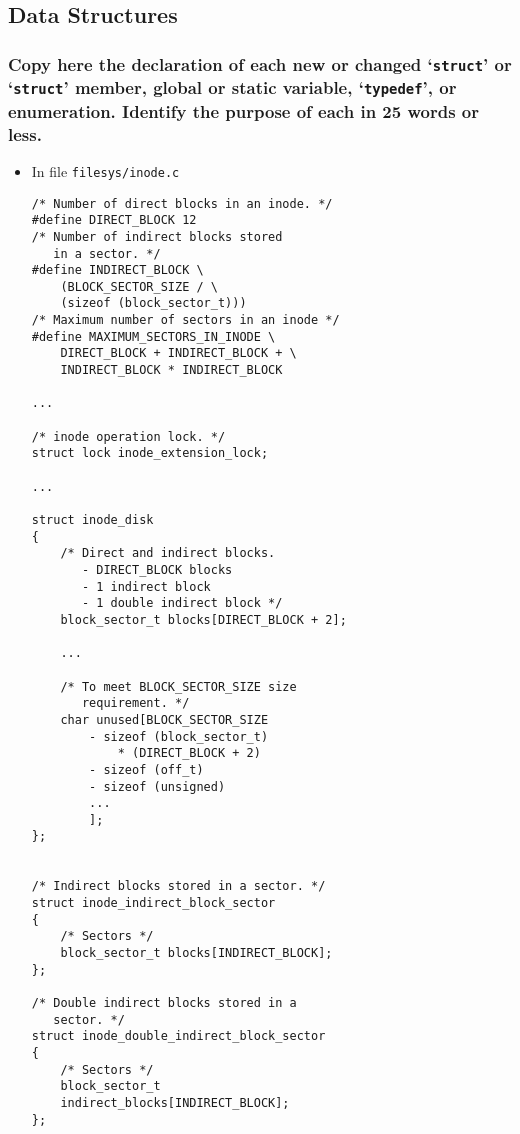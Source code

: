 \documentclass[sigconf, nonacm, balance=false, urlbreakonhyphens=true]{acmart}
\begin{document}
        \label{Indexed and Extensible Files}
    
        \subsection{Data Structures}
        
            \subsubsection{Copy here the declaration of each new or changed `\texttt{struct}' or `\texttt{struct}' member, global or static variable, `\texttt{typedef}', or enumeration. Identify the purpose of each in 25 words or less. }
        
                \begin{itemize}
                    \item In file \texttt{filesys/inode.c}
\begin{verbatim}
/* Number of direct blocks in an inode. */
#define DIRECT_BLOCK 12
/* Number of indirect blocks stored 
   in a sector. */
#define INDIRECT_BLOCK \
    (BLOCK_SECTOR_SIZE / \
    (sizeof (block_sector_t)))
/* Maximum number of sectors in an inode */
#define MAXIMUM_SECTORS_IN_INODE \
    DIRECT_BLOCK + INDIRECT_BLOCK + \
    INDIRECT_BLOCK * INDIRECT_BLOCK

...

/* inode operation lock. */
struct lock inode_extension_lock;

...

struct inode_disk
{
    /* Direct and indirect blocks. 
       - DIRECT_BLOCK blocks
       - 1 indirect block
       - 1 double indirect block */
    block_sector_t blocks[DIRECT_BLOCK + 2];
    
    ...

    /* To meet BLOCK_SECTOR_SIZE size 
       requirement. */
    char unused[BLOCK_SECTOR_SIZE
        - sizeof (block_sector_t) 
            * (DIRECT_BLOCK + 2)
        - sizeof (off_t)
        - sizeof (unsigned)
        ...
        ];
};


/* Indirect blocks stored in a sector. */
struct inode_indirect_block_sector
{
    /* Sectors */
    block_sector_t blocks[INDIRECT_BLOCK];
};

/* Double indirect blocks stored in a 
   sector. */
struct inode_double_indirect_block_sector
{
    /* Sectors */
    block_sector_t 
    indirect_blocks[INDIRECT_BLOCK];
}; 
\end{verbatim}
                \end{itemize}
            
\end{document}
